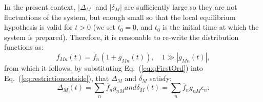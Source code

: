 In the present context, $|\Delta_M|$ and $|\delta_M|$ are sufficiently large so they are not
fluctuations of the system, but enough small so that the local equilibrium hypothesis is
valid for $t>0$ (we set $t_0=0$, and $t_0$ is the initial time at which the system is prepared).
Therefore, it is reasonable to re-write the distribution functions as:
%
\begin{equation}\label{eq:qFirstOrd}
   f_{Mn}(t)=\bar{f}_n(1+g_{Mn}(t)),\quad
   1\gg|g_{Mn}(t)|,
\end{equation}
%
from which it follows, by substituting Eq.~(\ref{eq:qFirstOrd}) into
Eq.~(\ref{eq:restrictionoutside}), that $\Delta_M$ and $\delta_M$ satisfy:
%
\begin{subequations}
\begin{equation}
    \Delta_M(t)=\sum_n \bar{f}_n g_{nM}
\end{equation}
%
and
%
\begin{equation}
	\delta_M(t)=\sum_n  \bar{f}_n g_{nM}\epsilon_n.
\end{equation}
\end{subequations}
%



